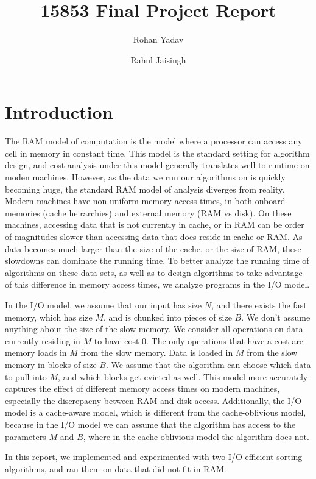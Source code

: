 \documentclass{article}
\author{
  Rohan Yadav\\
  \and
  Rahul Jaisingh\\
}
\title{15853 Final Project Report}
\date{}
\begin{document}
\maketitle

\section{Introduction}

The RAM model of computation is the model where
a processor can access any cell in memory in constant time.
%
This model is the standard setting for algorithm design, and
cost analysis under this model generally translates well to
runtime on moden machines.
%
However, as the data we run our algorithms on is quickly
becoming huge, the standard RAM model of analysis diverges from
reality.
%
Modern machines have non uniform memory access times,
in both onboard memories (cache heirarchies) and external memory
(RAM vs disk).
%
On these machines, accessing data that is not currently
in cache, or in RAM can be order of magnitudes slower than accessing
data that does reside in cache or RAM.
%
As data becomes much larger than the size of the cache, or the size of
RAM, these slowdowns can dominate the running time.
%
To better analyze the running time of algorithms on these data sets,
as well as to design algorithms to take advantage of this
difference in memory access times, we analyze programs in the I/O model.

In the I/O model, we assume that our input has size $N$, and there exists
the fast memory, which has size $M$, and is chunked into pieces of size $B$.
%
We don't assume anything about the size of the slow memory.
%
We consider all operations on data currently residing in $M$ to have cost 0.
%
The only operations that have a cost are memory loads in $M$ from the slow memory.
%
Data is loaded in $M$ from the slow memory in blocks of size $B$.
%
We assume that the algorithm can choose which data to pull into $M$,
and which blocks get evicted as well.
%
This model more accurately captures the effect of different memory access times
on modern machines, especially the discrepacny between RAM and disk access.
%
Additionally, the I/O model is a cache-aware model, which is different from
the cache-oblivious model, because in the I/O model we can assume that the
algorithm has access to the parameters $M$ and $B$, where in the cache-oblivious
model the algorithm does not.
%


In this report, we implemented and experimented with two I/O efficient
sorting algorithms, and ran them on data that did not fit in RAM.
\end{document}
